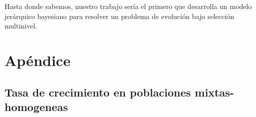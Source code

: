 \documentclass[a4paper,10pt]{article}
\begin{document}

Hasta donde sabemos, nuestro trabajo sería el primero que desarrolla un modelo jerárquico bayesiano para resolver un problema de evolución bajo selección multinivel.



{\footnotesize


}

\section{Apéndice}

\subsection{Tasa de crecimiento en poblaciones mixtas-homogeneas}
\end{document}

